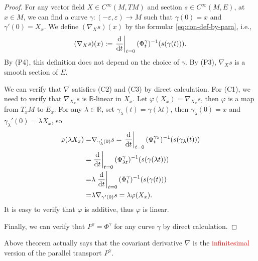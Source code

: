 \begin{proof}
    For any vector field $X\in C^\infty(M,TM)$ and section $s\in C^\infty(M,E)$, at $x\in M$, 
    we can find a curve $\gamma: (-\varepsilon,\varepsilon) \to M$ 
    such that $\gamma(0) = x$ and $\gamma'(0) = X_x$.
    We define $(\nabla_{X} s)(x)$ by the formular \eqref{eq:con-def-by-para}, i.e.,
    \begin{equation*}
        (\nabla_{X} s)(x) := \left.\frac{{\rm d} }{{\rm d} t}\right|_{t=0} (\Phi^{\gamma}_t)^{-1}(s(\gamma(t))).
    \end{equation*}
    By (P4), this definition does not depend on the choice of $\gamma$. By (P3), $\nabla_X s$ is a smooth section of $E$. 

    We can verify that $\nabla$ satisfies (C2) and (C3) by direct calculation. For (C1), we need to verify that 
    $\nabla_{X_x} s$ is $\mathbb{R}$-linear in $X_x$. Let $\varphi(X_x)= \nabla_{X_x} s$, then $\varphi$ is a map from $T_x M$ to $E_x$. 
    For any $\lambda\in \mathbb{R}$, set $\gamma_\lambda(t)=\gamma(\lambda t)$, then $\gamma_\lambda(0) = x$ and $\gamma_\lambda'(0) = \lambda X_x$, so
    \begin{align*}
        \varphi(\lambda X_x) =& \nabla_{\gamma_\lambda'(0)} s = \left.\frac{{\rm d} }{{\rm d} t}\right|_{t=0} (\Phi^{\gamma_\lambda}_t)^{-1}(s(\gamma_\lambda(t))) \\
        =& \left.\frac{{\rm d} }{{\rm d} t}\right|_{t=0} (\Phi^{\gamma}_{\lambda t})^{-1}(s(\gamma(\lambda t))) \\
        =& \lambda \left.\frac{{\rm d} }{{\rm d} t}\right|_{t=0} (\Phi^{\gamma}_{t})^{-1}(s(\gamma(t))) \\
        =& \lambda\nabla_{\gamma'(0)} s = \lambda \varphi(X_x).
    \end{align*}
    It is easy to verify that $\varphi$ is additive, thus $\varphi$ is linear.

    Finally, we can verify that $P^\gamma = \Phi^\gamma$ for any curve $\gamma$ by direct calculation. 
\end{proof}

Above theorem actually says that the covariant derivative $\nabla$ is the \textcolor{red}{infinitesimal} version of the parallel transport $P^\gamma$.

